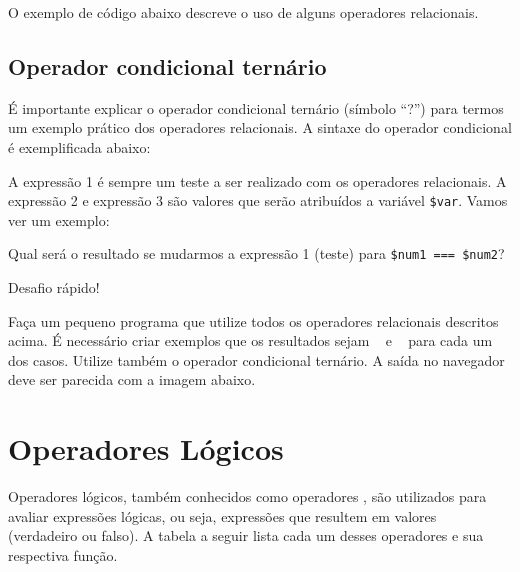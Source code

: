 

O exemplo de código abaixo descreve o uso de alguns operadores relacionais.



\subsection{Operador condicional ternário}
\label{operador-condicional-ternario}

É importante explicar o operador condicional ternário (símbolo ``?'') para termos um exemplo 
prático dos operadores relacionais. A sintaxe do operador condicional é exemplificada abaixo:



A expressão 1 é sempre um teste a ser realizado com os operadores relacionais. A expressão
2 e expressão 3 são valores que serão atribuídos a variável \texttt{\$var}. Vamos ver um exemplo:



Qual será o resultado se mudarmos a expressão 1 (teste) para \texttt{\$num1 === \$num2}?

{\Large Desafio rápido!}

Faça um pequeno programa que utilize todos os operadores relacionais descritos acima.
É necessário criar exemplos que os resultados sejam \true~ e \false~ para cada
um dos casos. Utilize também o operador condicional ternário. A saída no navegador
deve ser parecida com a imagem abaixo.


\section{Operadores Lógicos}
\label{operadores-logicos}

Operadores lógicos, também conhecidos como operadores \booleanos, são utilizados para
avaliar expressões lógicas, ou seja, expressões que resultem em valores \booleanos~
(verdadeiro ou falso). A tabela a seguir lista cada um desses operadores e sua respectiva
função.



